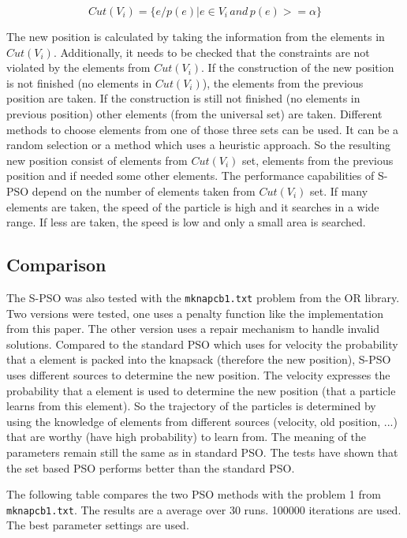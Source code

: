 \documentclass{article}
\begin{document}
\begin{equation}
Cut(V_i) = \{e/p(e)| e \in V_i \, and \, p(e) >= \alpha\}
\end{equation}

The new position is calculated by taking the information from the elements in $Cut(V_i)$. Additionally, it needs to be checked that the constraints are not violated by the elements from $Cut(V_i)$. If the construction of the new position is not finished (no elements in $Cut(V_i)$), the elements from the previous position are taken. If the construction is still not finished (no elements in previous position) other elements (from the universal set) are taken. Different methods to choose elements from one of those three sets can be used. It can be a random selection or a method which uses a heuristic approach. So the resulting new position consist of elements from $Cut(V_i)$ set, elements from the previous position and if needed some other elements. The performance capabilities of S-PSO depend on the number of elements taken from $Cut(V_i)$ set. If many elements are taken, the speed of the particle is high and it searches in a wide range. If less are taken, the speed is low and only a small area is searched.

\subsection{Comparison}
The S-PSO was also tested with the \lstinline$mknapcb1.txt$ problem from the OR library. Two versions were tested, one uses a penalty function like the implementation from this paper. The other version uses a repair mechanism to handle invalid solutions. Compared to the standard PSO which uses for velocity the probability that a element is packed into the knapsack (therefore the new position), S-PSO uses different sources to determine the new position. The velocity expresses the probability that a element is used to determine the new position (that a particle learns from this element). So the trajectory of the particles is determined by using the knowledge of elements from different sources (velocity, old position, ...) that are worthy (have high probability) to learn from. The meaning of the parameters remain still the same as in standard PSO. The tests have shown that the set based PSO performs better than the standard PSO.

\newpage

The following table compares the two PSO methods with the problem 1 from \lstinline$mknapcb1.txt$. The results are a average over 30 runs. 100000 iterations are used. The best parameter settings are used.\\
\end{document}
